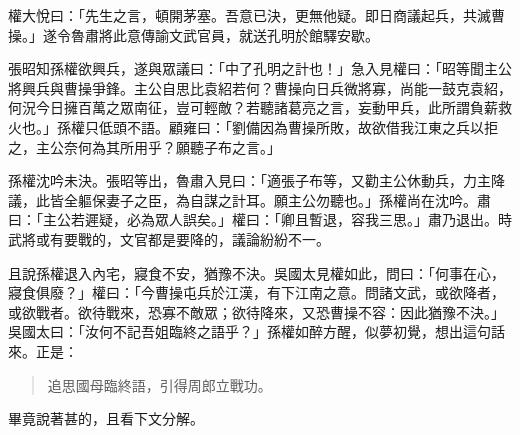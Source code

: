 權大悅曰：「先生之言，頓開茅塞。吾意已決，更無他疑。即日商議起兵，共滅曹操。」遂令魯肅將此意傳諭文武官員，就送孔明於館驛安歇。

張昭知孫權欲興兵，遂與眾議曰：「中了孔明之計也！」急入見權曰：「昭等聞主公將興兵與曹操爭鋒。主公自思比袁紹若何？曹操向日兵微將寡，尚能一鼓克袁紹，何況今日擁百萬之眾南征，豈可輕敵？若聽諸葛亮之言，妄動甲兵，此所謂負薪救火也。」孫權只低頭不語。顧雍曰：「劉備因為曹操所敗，故欲借我江東之兵以拒之，主公奈何為其所用乎？願聽子布之言。」

孫權沈吟未決。張昭等出，魯肅入見曰：「適張子布等，又勸主公休動兵，力主降議，此皆全軀保妻子之臣，為自謀之計耳。願主公勿聽也。」孫權尚在沈吟。肅曰：「主公若遲疑，必為眾人誤矣。」權曰：「卿且暫退，容我三思。」肅乃退出。時武將或有要戰的，文官都是要降的，議論紛紛不一。

且說孫權退入內宅，寢食不安，猶豫不決。吳國太見權如此，問曰：「何事在心，寢食俱廢？」權曰：「今曹操屯兵於江漢，有下江南之意。問諸文武，或欲降者，或欲戰者。欲待戰來，恐寡不敵眾；欲待降來，又恐曹操不容：因此猶豫不決。」吳國太曰：「汝何不記吾姐臨終之語乎？」孫權如醉方醒，似夢初覺，想出這句話來。正是：

\begin{quote}
追思國母臨終語，引得周郎立戰功。
\end{quote}

畢竟說著甚的，且看下文分解。
